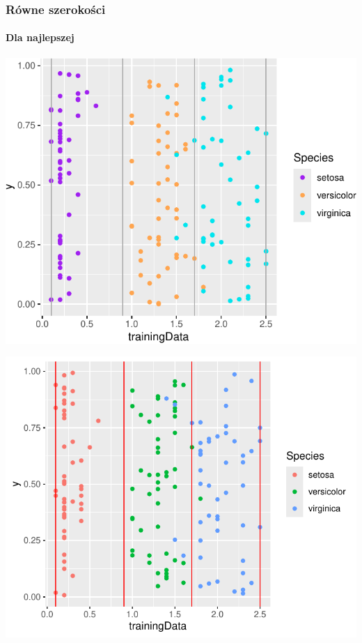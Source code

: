 \documentclass[
  12pt,
]{article}
\begin{document}
\subsubsection{Równe szerokości}\label{ruxf3wne-szerokoux15bci}

\paragraph{Dla najlepszej}\label{dla-najlepszej-1}

\begin{center}\includegraphics{Sprawozdanie2_files/figure-latex/width_najl-1} \end{center}

\begin{center}\includegraphics{Sprawozdanie2_files/figure-latex/width_najl-2} \end{center}
\end{document}
